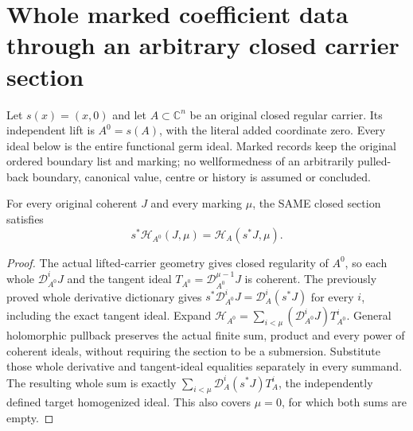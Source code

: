 \chapter{Whole marked coefficient data through an arbitrary closed carrier section}

Let $s(x)=(x,0)$ and let $A\subset\mathbb C^n$ be an original closed regular carrier. Its independent lift is $A^0=s(A)$, with the literal added coordinate zero. Every ideal below is the entire functional germ ideal. Marked records keep the original ordered boundary list and marking; no wellformedness of an arbitrarily pulled-back boundary, canonical value, centre or history is assumed or concluded.

\begin{theorem}
\label{hir:actual-zero-section-submanifold-whole-homogenized-ideal}
\leanok
For every original coherent $J$ and every marking $\mu$, the SAME closed section satisfies
\[
 s^*\mathcal H_{A^0}(J,\mu)=\mathcal H_A(s^*J,\mu).
\]
\end{theorem}
\begin{proof}
The actual lifted-carrier geometry gives closed regularity of $A^0$, so each whole $\mathcal D_{A^0}^iJ$ and the tangent ideal $T_{A^0}=\mathcal D_{A^0}^{\mu-1}J$ is coherent. The previously proved whole derivative dictionary gives $s^*\mathcal D_{A^0}^iJ=\mathcal D_A^i(s^*J)$ for every $i$, including the exact tangent ideal. Expand $\mathcal H_{A^0}=\sum_{i<\mu}(\mathcal D_{A^0}^iJ)T_{A^0}^i$. General holomorphic pullback preserves the actual finite sum, product and every power of coherent ideals, without requiring the section to be a submersion. Substitute those whole derivative and tangent-ideal equalities separately in every summand. The resulting whole sum is exactly $\sum_{i<\mu}\mathcal D_A^i(s^*J)T_A^i$, the independently defined target homogenized ideal. This also covers $\mu=0$, for which both sums are empty.
\end{proof}

